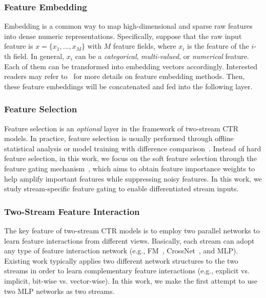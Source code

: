 \documentclass[letterpaper]{article} \usepackage{aaai23}  \usepackage{times}  \usepackage{helvet}  \usepackage{courier}  \usepackage[hyphens]{url}  \usepackage{graphicx} \urlstyle{rm} \def\UrlFont{\rm}  \usepackage{natbib}  \usepackage{caption} \frenchspacing  \setlength{\pdfpagewidth}{8.5in}  \setlength{\pdfpageheight}{11in}  \usepackage{algorithm}
\begin{document}
\subsubsection{\textbf{Feature Embedding}}
Embedding is a common way to map high-dimensional and sparse raw features into dense numeric representations. Specifically, suppose that the raw input feature is $x = \{x_1, ..., x_M\}$ with $M$ feature fields, where $x_i$ is the feature of the $i$-th field. In general, $x_i$ can be a \textit{categorical}, \textit{multi-valued}, or \textit{numerical} feature. Each of them can be transformed into embedding vectors accordingly. Interested readers may refer to~\cite{fuxictr} for more details on feature embedding methods. Then, these feature embeddings will be concatenated and fed into the following layer.











\subsubsection{\textbf{Feature Selection}}
Feature selection is an \textit{optional} layer in the framework of two-stream CTR models. In practice, feature selection is usually performed through offline statistical analysis or model training with difference comparison~\cite{FeatureSelection}. Instead of hard feature selection, in this work, we focus on the soft feature selection through the feature gating mechanism~\cite{FiBiNET,FeatureGating}, which aims to obtain feature importance weights to help amplify important features while suppressing noisy features. In this work, we study stream-specific feature gating to enable differentiated stream inputs.


\subsubsection{\textbf{Two-Stream Feature Interaction}}
\label{sec:fusion_layer}
The key feature of two-stream CTR models is to employ two parallel networks to learn feature interactions from different views. Basically, each stream can adopt any type of feature interaction network (e.g., FM~\cite{FM}, CrossNet~\cite{DCN}, and MLP). Existing work typically applies two different network structures to the two streams in order to learn complementary feature interactions (e.g., explicit vs. implicit, bit-wise vs. vector-wise). In this work, we make the first attempt to use two MLP networks as two streams.
\end{document}
